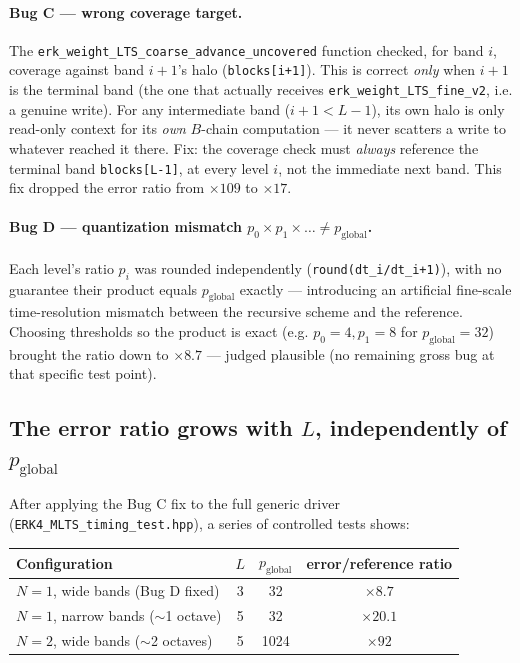 \documentclass[11pt]{article}
\newcommand{\code}[1]{\texttt{#1}}
\begin{document}
\paragraph{Bug C --- wrong coverage target.} The
\code{erk\_weight\_LTS\_coarse\_advance\_uncovered} function checked, for
band $i$, coverage against band $i{+}1$'s halo (\code{blocks[i+1]}). This
is correct \emph{only} when $i{+}1$ is the terminal band (the one that
actually receives \code{erk\_weight\_LTS\_fine\_v2}, i.e. a genuine
write). For any intermediate band ($i+1 < L-1$), its own halo is only
read-only context for its \emph{own} $B$-chain computation --- it never
scatters a write to whatever reached it there. Fix: the coverage check
must \emph{always} reference the terminal band \code{blocks[L-1]}, at
every level $i$, not the immediate next band. This fix dropped the error
ratio from $\times 109$ to $\times 17$.

\paragraph{Bug D --- quantization mismatch $p_0 \times p_1 \times \dots
\ne p_{\text{global}}$.} Each level's ratio $p_i$ was rounded
independently (\code{round(dt\_i/dt\_{i+1})}), with no guarantee their
product equals $p_{\text{global}}$ exactly --- introducing an artificial
fine-scale time-resolution mismatch between the recursive scheme and the
reference. Choosing thresholds so the product is exact (e.g. $p_0=4,
p_1=8$ for $p_{\text{global}}=32$) brought the ratio down to
$\times 8.7$ --- judged plausible (no remaining gross bug at that
specific test point).

\subsection{The error ratio grows with $L$, independently of $p_{\text{global}}$}

After applying the Bug C fix to the full generic driver
(\code{ERK4\_MLTS\_timing\_test.hpp}), a series of controlled tests shows:
\begin{center}
\begin{tabular}{lccc}
\toprule
Configuration & $L$ & $p_{\text{global}}$ & error/reference ratio \\
\midrule
$N=1$, wide bands (Bug D fixed) & 3 & 32 & $\times 8.7$ \\
$N=1$, narrow bands ($\sim$1 octave) & 5 & 32 & $\times 20.1$ \\
$N=2$, wide bands ($\sim$2 octaves) & 5 & 1024 & $\times 92$ \\
\bottomrule
\end{tabular}
\end{center}
\end{document}

